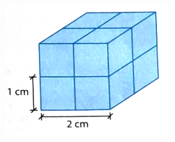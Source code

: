 \documentclass[a4paper,14pt]{article}
\begin{document}
\begin{multicols}{2}
\begin{enumerate}
            \includegraphics[width=1\linewidth]{6FMA47_imagens/imagem3}
            

\end{enumerate}
\end{multicols}
\end{document}
